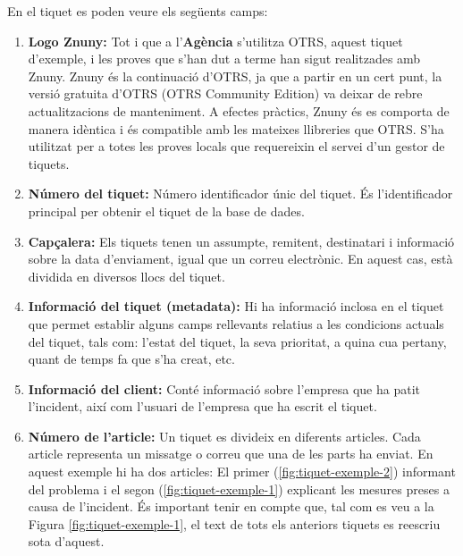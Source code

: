 En el tiquet es poden veure els següents camps:
\begin{enumerate}
    \item \textbf{Logo Znuny:} Tot i que a l'\textbf{Agència} s'utilitza OTRS, aquest tiquet d'exemple, i les proves que s'han dut a terme han sigut realitzades amb Znuny. Znuny és la continuació d'OTRS, ja que a partir en un cert punt, la versió gratuita d'OTRS (OTRS Community Edition) va deixar de rebre actualitzacions de manteniment. A efectes pràctics, Znuny és es comporta de manera idèntica i és compatible amb les mateixes llibreries que OTRS. S'ha utilitzat per a totes les proves locals que requereixin el servei d'un gestor de tiquets.
    \item \textbf{Número del tiquet:} Número identificador únic del tiquet. És l'identificador principal per obtenir el tiquet de la base de dades.
    \item \textbf{Capçalera:} Els tiquets tenen un assumpte, remitent, destinatari i informació sobre la data d'enviament, igual que un correu electrònic. En aquest cas, està dividida en diversos llocs del tiquet.
    \item \textbf{Informació del tiquet (metadata):} Hi ha informació inclosa en el tiquet que permet establir alguns camps rellevants relatius a les condicions actuals del tiquet, tals com: l'estat del tiquet, la seva prioritat, a quina cua pertany, quant de temps fa que s'ha creat, etc.
    \item \textbf{Informació del client:} Conté informació sobre l'empresa que ha patit l'incident, així com l'usuari de l'empresa que ha escrit el tiquet.
    \item \textbf{Número de l'article:} Un tiquet es divideix en diferents articles. Cada article representa un missatge o correu que una de les parts ha enviat. En aquest exemple hi ha dos articles: El primer (\ref{fig:tiquet-exemple-2}) informant del problema i el segon (\ref{fig:tiquet-exemple-1}) explicant les mesures preses a causa de l'incident. És important tenir en compte que, tal com es veu a la Figura \ref{fig:tiquet-exemple-1}, el text de tots els anteriors tiquets es reescriu sota d'aquest.
\end{enumerate}

